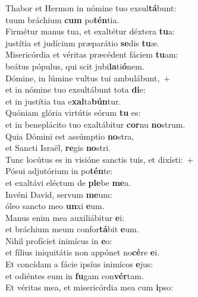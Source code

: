 \oddverse Thabor et Hermon in nómine tuo exsul\textbf{tá}bunt:~\*\\
\oddverse tuum bráchium \textbf{cum} po\textbf{tén}tia.\\
\evenverse Firmétur manus tua, et exaltétur déxtera \textbf{tu}a:~\*\\
\evenverse justítia et judícium præparátio \textbf{se}dis \textbf{tu}æ.\\
\oddverse Misericórdia et véritas præcédent fáciem \textbf{tu}am:~\*\\
\oddverse beátus pópulus, qui scit jubi\textbf{la}ti\textbf{ó}nem.\\
\evenverse Dómine, in lúmine vultus tui ambulábunt,~+\\
\evenverse  et in nómine tuo exsultábunt tota \textbf{di}e:~\*\\
\evenverse et in justítia tua e\textbf{xal}ta\textbf{bún}tur.\\
\oddverse Quóniam glória virtútis eórum \textbf{tu} es:~\*\\
\oddverse et in beneplácito tuo exaltábitur \textbf{cor}nu \textbf{no}strum.\\
\evenverse Quia Dómini est assúmptio \textbf{no}stra,~\*\\
\evenverse et Sancti Israël, \textbf{re}gis \textbf{no}stri.\\
\oddverse Tunc locútus es in visióne sanctis tuis, et dixísti:~+\\
\oddverse  Pósui adjutórium in po\textbf{tén}te:~\*\\
\oddverse et exaltávi eléctum de \textbf{ple}be \textbf{me}a.\\
\evenverse Invéni David, servum \textbf{me}um:~\*\\
\evenverse óleo sancto meo \textbf{un}xi \textbf{e}um.\\
\oddverse Manus enim mea auxiliábitur \textbf{e}i:~\*\\
\oddverse et bráchium meum confor\textbf{tá}bit \textbf{e}um.\\
\evenverse Nihil profíciet inimícus in \textbf{e}o:~\*\\
\evenverse et fílius iniquitátis non appónet no\textbf{cé}re \textbf{e}i.\\
\oddverse Et concídam a fácie ipsíus inimícos \textbf{e}jus:~\*\\
\oddverse et odiéntes eum in \textbf{fu}gam con\textbf{vér}tam.\\
\evenverse Et véritas mea, et misericórdia mea cum \textbf{i}pso:~\*\\
